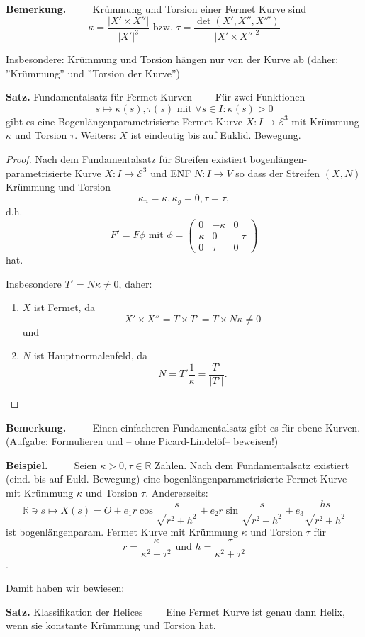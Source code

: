 \documentclass[a4paper,oneside,11pt,DIV=12,parskip=half]{scrartcl}
\newcommand{\R}{\mathbb R}
\newcommand{\E}{\mathcal E}
\newenvironment{note}{\textbf{Bemerkung.} ~~~~}{}
\newenvironment{theorem}[1][]{\textbf{Satz.} #1~~~~}{}
\newenvironment{example}{\textbf{Beispiel.} ~~~~}{}
\newenvironment{lemma, definition}{\textbf{Lemma und Definition.} ~~~~}{}
\newenvironment{note, example}{\textbf{Bemerkung und Beispiel.} ~~~~}{}
\newenvironment{note, definition}{\textbf{Bemerkung und Definition.} ~~~~}{}
\begin{document}
\begin{note}
	Krümmung und Torsion einer Fermet Kurve sind \[ \kappa = \frac{|X' \times X''|}{|X'|^3} \text{ bzw. }  \tau = \frac{\det(X',X'',X''')}{|X' \times X''|^2} \]
	
	Insbesondere: Krümmung und Torsion hängen nur von der Kurve ab (daher: ''Krümmung'' und ''Torsion der Kurve'')
\end{note}

\begin{theorem}[Fundamentalsatz für Fermet Kurven]
	Für zwei Funktionen \[ s \mapsto \kappa(s), \tau(s) \text{ mit } \forall s \in I: \kappa(s) > 0 \] gibt es eine Bogenlängenparametrisierte Fermet Kurve $X: I \rightarrow \E ^3$ mit Krümmung $\kappa$ und Torsion $\tau$. 
	Weiters: $X$ ist eindeutig bis auf Euklid. Bewegung.
\end{theorem}

\begin{proof}
	Nach dem Fundamentalsatz für Streifen existiert bogenlängen-parametrisierte Kurve $X: I \rightarrow \E^3$ und ENF $N: I \rightarrow V$ so dass der Streifen $ (X,N)$ Krümmung und Torsion \[  \kappa_n = \kappa, \kappa_g = 0, \tau = \tau,  \] d.h.\[F' = F\phi \text{ mit } \phi = \begin{pmatrix}
	0 & - \kappa & 0\\
\kappa & 0 & - \tau \\
0 & \tau & 0
	\end{pmatrix} \] hat.
	
	Insbesondere $T' = N\kappa \not = 0$, daher:
	\begin{enumerate}
	\item $X$ ist Fermet, da
	\[ X' \times X'' = T \times T' = T \times N\kappa \not = 0 \]
	und \item  $N$ ist Hauptnormalenfeld, da \[ N = T'\frac{1}{\kappa} = \frac{T'}{|T'|}. \]
	
	\end{enumerate}
\end{proof}

\begin{note}
	Einen einfacheren Fundamentalsatz gibt es für ebene Kurven. (Aufgabe: Formulieren und -- ohne Picard-Lindelöf-- beweisen!)
\end{note}

\begin{example}
	Seien $\kappa > 0, \tau \in \R$ Zahlen. Nach dem Fundamentalsatz existiert (eind. bis auf Eukl. Bewegung) eine bogenlängenparametrisierte Fermet Kurve mit Krümmung $\kappa$ und Torsion $\tau$. Andererseits: \[ \R \ni s \mapsto X(s) = O + e_1 r \cos \frac{s}{\sqrt{r^2+h^2}} + e_2 r \sin \frac{s}{\sqrt{r^2+h^2}} + e_3 \frac{hs}{\sqrt{r^2 + h^2}}\] ist bogenlängenparam. Fermet Kurve mit Krümmung $\kappa$ und Torsion $\tau$ für \[ r= \frac{\kappa}{\kappa^2 + \tau^2} \text{ und } h = \frac{ \tau}{\kappa^2 + \tau^2} \].
	
	Damit haben wir bewiesen:
\end{example}

\begin{theorem}[Klassifikation der Helices]
	Eine Fermet Kurve ist genau dann Helix, wenn sie konstante Krümmung und Torsion hat.
\end{theorem}
\end{document}

